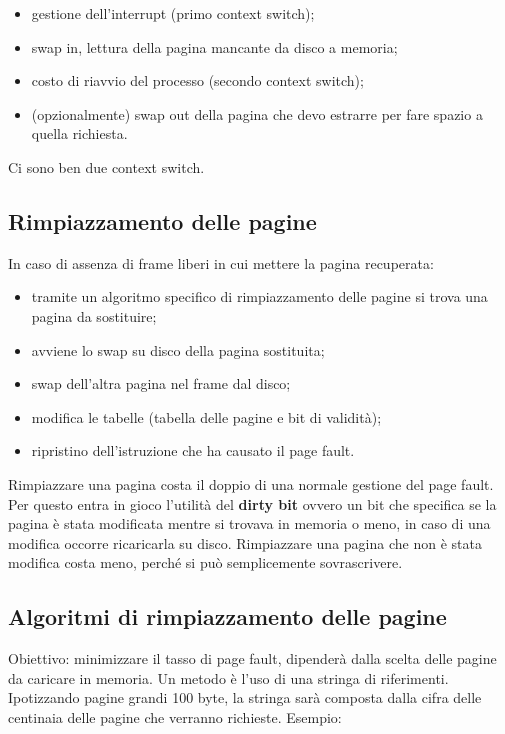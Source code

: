 \documentclass[a4paper, 12pt]{book}
\begin{document}
\begin{itemize}
    \item gestione dell'interrupt (primo context switch);
    \item swap in, lettura della pagina mancante da disco a memoria;
    \item costo di riavvio del processo (secondo context switch);
    \item (opzionalmente) swap out della pagina che devo estrarre per fare spazio a quella richiesta.
\end{itemize}

Ci sono ben due context switch.

\subsection{Rimpiazzamento delle pagine}

In caso di assenza di frame liberi in cui mettere la pagina recuperata:

\begin{itemize}
    \item tramite un algoritmo specifico di rimpiazzamento delle pagine si trova una pagina da sostituire;
    \item avviene lo swap su disco della pagina sostituita;
    \item swap dell'altra pagina nel frame dal disco;
    \item modifica le tabelle (tabella delle pagine e bit di validità);
    \item ripristino dell'istruzione che ha causato il page fault.
\end{itemize}

Rimpiazzare una pagina costa il doppio di una normale gestione del page fault. Per questo entra in gioco l'utilità del \textbf{dirty bit}
ovvero un bit che specifica se la pagina è stata modificata mentre si trovava in memoria o meno, in caso di una modifica occorre
ricaricarla su disco. Rimpiazzare una pagina che non è stata modifica costa meno, perché si può semplicemente sovrascrivere.

\subsection{Algoritmi di rimpiazzamento delle pagine}

Obiettivo: minimizzare il tasso di page fault, dipenderà dalla scelta delle pagine da caricare in memoria. Un metodo è l'uso 
di una stringa di riferimenti. Ipotizzando pagine grandi 100 byte, la stringa sarà composta dalla cifra delle centinaia delle 
pagine che verranno richieste. Esempio: 
\end{document}
